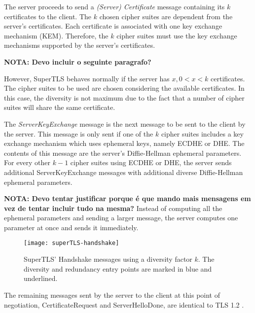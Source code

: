 \documentclass{sig-alternate-05-2015}
\begin{document}
The server proceeds to send a \textit{(Server) Certificate} message containing its $k$ certificates to the client. The $k$ chosen cipher suites are dependent from the server's certificates. Each certificate is associated with one key exchange mechanism (KEM). Therefore, the $k$ cipher suites must use the key exchange mechanisms supported by the server's certificates.

\textbf{NOTA: Devo incluir o seguinte paragrafo?}

However, SuperTLS behaves normally if the server has $x, 0 < x < k$ certificates. The cipher suites to be used are chosen considering the available certificates. In this case, the diversity is not maximum due to the fact that a number of cipher suites will share the same certificate.

The \textit{ServerKeyExchange} message is the next message to be sent to the client by the server. This message is only sent if one of the $k$ cipher suites includes a key exchange mechanism which uses ephemeral keys, namely ECDHE or DHE. The contents of this message are the server's Diffie-Hellman ephemeral parameters. For every other $k - 1$ cipher suites using ECDHE or DHE, the server sends additional ServerKeyExchange messages with additional diverse Diffie-Hellman ephemeral parameters.

\textbf{NOTA: Devo tentar justificar porque \'e que mando mais mensagens em vez de tentar incluir tudo na mesma?}
Instead of computing all the ephemeral parameters and sending a larger message, the server computes one parameter at once and sends it immediately.

\begin{figure}[t]
\texttt{[image: superTLS-handshake]}
\centering
\caption{SuperTLS' Handshake messages using a diversity factor $k$. The diversity and redundancy entry points are marked in blue and underlined.}
\label{fig:superTLS-example}
\end{figure}


The remaining messages sent by the server to the client at this point of negotiation, CertificateRequest and ServerHelloDone, are identical to TLS 1.2 \cite{TLS1.2-5246}.
\end{document}
